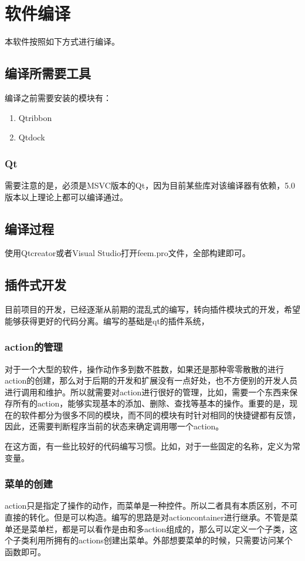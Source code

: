 \chapter{软件编译}
本软件按照如下方式进行编译。
\section{编译所需要工具}
编译之前需要安装的模块有：
\begin{enumerate}
	\item Qtribbon
	\item Qtdock
\end{enumerate}
\subsection{Qt}
需要注意的是，必须是MSVC版本的Qt，因为目前某些库对该编译器有依赖，5.0版本以上理论上都可以编译通过。
\section{编译过程}
使用Qtcreator或者Visual Studio打开feem.pro文件，全部构建即可。
\section{插件式开发}
目前项目的开发，已经逐渐从前期的混乱式的编写，转向插件模块式的开发，希望能够获得更好的代码分离。编写的基础是qt的插件系统，
\subsection{action的管理}
对于一个大型的软件，操作动作多到数不胜数，如果还是那种零零散散的进行action的创建，那么对于后期的开发和扩展没有一点好处，也不方便别的开发人员进行调用和维护。所以就需要对action进行很好的管理，比如，需要一个东西来保存所有的action，能够实现基本的添加、删除、查找等基本的操作。重要的是，现在的软件都分为很多不同的模块，而不同的模块有时针对相同的快捷键都有反馈，因此，还需要判断程序当前的状态来确定调用哪一个action。

在这方面，有一些比较好的代码编写习惯。比如，对于一些固定的名称，定义为常变量。
\subsection{菜单的创建}
action只是指定了操作的动作，而菜单是一种控件。所以二者具有本质区别，不可直接的转化。但是可以构造。编写的思路是对actioncontainer进行继承。不管是菜单还是菜单栏，都是可以看作是由和多action组成的，那么可以定义一个子类，这个子类利用所拥有的actions创建出菜单。外部想要菜单的时候，只需要访问某个函数即可。
